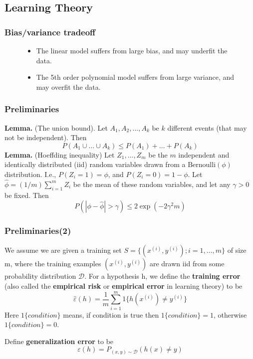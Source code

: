 \documentclass[slidestop,compress,mathserif]{beamer}
\begin{document}
	\subsection{Learning Theory}
	\begin{frame}
		\frametitle{Bias/variance tradeoff}
		\begin{figure}
           \begin{itemize}
           	\item The linear model suffers from large bias, and may 
           	underfit the data.
           	\item The 5th order polynomial model suffers from large 
           	variance, and may overfit the data.
           \end{itemize}
        \end{figure}
	\end{frame}	
	\begin{frame}
		\frametitle{Preliminaries}
		\textbf{Lemma.} (The union bound). Let $A_1,A_2,\ldots,A_k$ 
		be $k$ different events (that may not be independent). Then
		$$P(A_1\cup\ldots\cup A_k)\le P(A_1)+\ldots+P(A_k)$$
		\textbf{Lemma.} (Hoeffding inequality) Let $Z_1,\ldots,Z_m$ 
		be the $m$ independent and identically distributed (iid) random
		variables drawn from a $\mathrm{Bernoulli} (\phi)$ distribution.
		I.e., $P(Z_i=1)=\phi$, and $P(Z_i=0)=1-\phi$. Let $\hat{\phi}
		=(1/m)\sum_{i=1}^mZ_i$ be the mean of these random variables,
		and let any $\gamma >0$ be fixed. Then
		$$P(|\phi-\hat{\phi}|>\gamma)\le 2\exp(-2\gamma^2m)$$
		
	\end{frame}
	\begin{frame}
		\frametitle{Preliminaries(2)}
		We assume we are given a training set $S=\{(x^{(i)},y^{(i)});
		i=1,\ldots,m\}$ of size m, where the training examples $(x^{(i)},
		y^{(i)})$ are drawn iid from some probability distribution
		$\mathcal{D}$. For a hypothesis h, we define the \textbf{
		training error} (also called the \textbf{empirical risk} or
		\textbf{empirical error} in learning theory) to be
		$$\hat{\varepsilon}(h)=\frac{1}{m}\sum_{i=1}^m1\{
		h(x^{(i)}) \neq y^{(i)}\}$$
		Here $1\{condition\}$ means, if condition is true then 
		$1\{condition\}=1$, otherwise $1\{condition\}=0$. 
		
		Define \textbf{generalization error} to be
		$$\varepsilon(h)=P_{(x,y)\sim \mathcal{D}}(h(x)\neq y)$$
	\end{frame}
\end{document}
